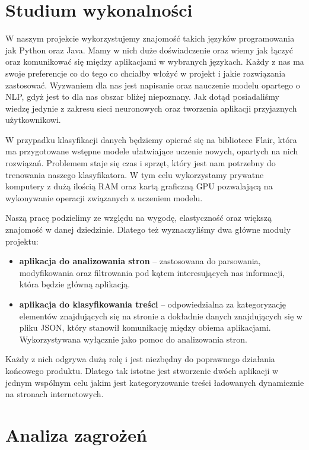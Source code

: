 \section{Studium wykonalności}
\label{sec:1.5.}

W naszym projekcie wykorzystujemy znajomość takich języków programowania jak Python oraz Java. Mamy w nich duże doświadczenie oraz wiemy jak łączyć oraz komunikować się między aplikacjami w wybranych językach. Każdy z nas ma swoje preferencje co do tego co chciałby włożyć w projekt i jakie rozwiązania zastosować. Wyzwaniem dla nas jest napisanie oraz nauczenie modelu opartego o NLP, gdyż jest to dla nas obszar bliżej niepoznany. Jak dotąd posiadaliśmy wiedzę jedynie z zakresu sieci neuronowych oraz tworzenia aplikacji przyjaznych użytkownikowi.
    
W przypadku klasyfikacji danych będziemy opierać się na bibliotece Flair, która ma przygotowane wstępne modele ułatwiające uczenie nowych, opartych na nich rozwiązań. Problemem staje się czas i sprzęt, który jest nam potrzebny do trenowania naszego klasyfikatora. W tym celu wykorzystamy prywatne komputery z dużą ilością RAM oraz kartą graficzną GPU pozwalającą na wykonywanie operacji związanych z uczeniem modelu.

Naszą pracę podzielimy ze względu na wygodę, elastyczność oraz większą znajomość w danej dziedzinie. Dlatego też wyznaczyliśmy dwa główne moduły projektu:
\begin{itemize}
\item \textbf{aplikacja do analizowania stron} – zastosowana do parsowania, modyfikowania oraz filtrowania pod kątem interesujących nas informacji, która będzie główną aplikacją.
\item \textbf{aplikacja do klasyfikowania treści} – odpowiedzialna za kategoryzację elementów znajdujących się na stronie a dokładnie danych znajdujących się w pliku JSON, który stanowił komunikację między obiema aplikacjami. Wykorzystywana wyłącznie jako pomoc do analizowania stron.
\end{itemize}
Każdy z nich odgrywa dużą rolę i jest niezbędny do poprawnego działania końcowego produktu. Dlatego tak istotne jest stworzenie dwóch aplikacji w jednym wspólnym celu jakim jest kategoryzowanie treści ładowanych dynamicznie na stronach internetowych. 

\section{Analiza zagrożeń}
\label{sec:1.6.}

